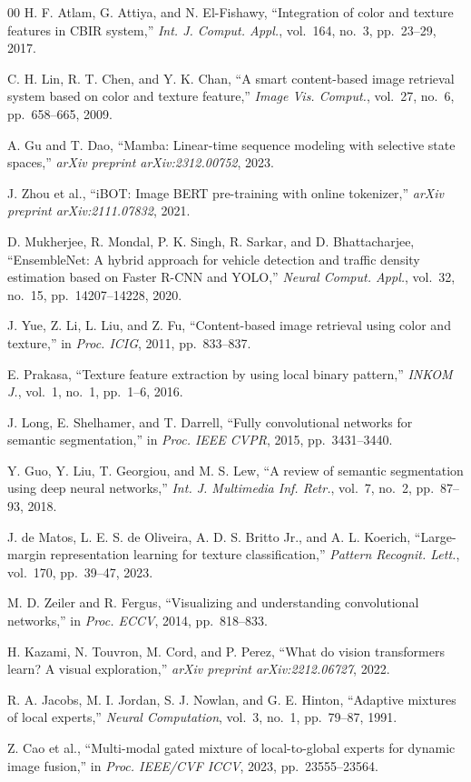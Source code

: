 \documentclass[letterpaper, 10 pt, conference]{ieeeconf}
\begin{document}
\begin{thebibliography}{00}
H. F. Atlam, G. Attiya, and N. El-Fishawy, ``Integration of color and
texture features in CBIR system,'' \emph{Int. J. Comput. Appl.},
vol.~164, no.~3, pp.~23--29, 2017.

C. H. Lin, R. T. Chen, and Y. K. Chan, ``A smart content-based image
retrieval system based on color and texture feature,'' \emph{Image Vis.
Comput.}, vol.~27, no.~6, pp.~658--665, 2009.

A. Gu and T. Dao, ``Mamba: Linear-time sequence modeling with selective
state spaces,'' \emph{arXiv preprint arXiv:2312.00752}, 2023.

J. Zhou et al., ``iBOT: Image BERT pre-training with online tokenizer,''
\emph{arXiv preprint arXiv:2111.07832}, 2021.

D. Mukherjee, R. Mondal, P. K. Singh, R. Sarkar, and D. Bhattacharjee,
``EnsembleNet: A hybrid approach for vehicle detection and traffic density
estimation based on Faster R-CNN and YOLO,'' \emph{Neural Comput. Appl.},
vol.~32, no.~15, pp.~14207--14228, 2020.

J. Yue, Z. Li, L. Liu, and Z. Fu, ``Content-based image retrieval using
color and texture,'' in \emph{Proc. ICIG}, 2011, pp.~833--837.

E. Prakasa, ``Texture feature extraction by using local binary pattern,''
\emph{INKOM J.}, vol.~1, no.~1, pp.~1--6, 2016.

J. Long, E. Shelhamer, and T. Darrell, ``Fully convolutional networks for
semantic segmentation,'' in \emph{Proc. IEEE CVPR}, 2015, pp.~3431--3440.

Y. Guo, Y. Liu, T. Georgiou, and M. S. Lew, ``A review of semantic
segmentation using deep neural networks,'' \emph{Int. J. Multimedia Inf.
Retr.}, vol.~7, no.~2, pp.~87--93, 2018.

J. de Matos, L. E. S. de Oliveira, A. D. S. Britto Jr., and
A. L. Koerich, ``Large-margin representation learning for texture
classification,'' \emph{Pattern Recognit. Lett.}, vol.~170, pp.~39--47,
2023.

M. D. Zeiler and R. Fergus, ``Visualizing and understanding convolutional
networks,'' in \emph{Proc. ECCV}, 2014, pp.~818--833.

H. Kazami, N. Touvron, M. Cord, and P. Perez, ``What do vision
transformers learn? A visual exploration,''
\emph{arXiv preprint arXiv:2212.06727}, 2022.

R. A. Jacobs, M. I. Jordan, S. J. Nowlan, and G. E. Hinton,
``Adaptive mixtures of local experts,''
\emph{Neural Computation}, vol.~3, no.~1, pp.~79--87, 1991.

Z. Cao et al., ``Multi-modal gated mixture of local-to-global experts for
dynamic image fusion,'' in \emph{Proc. IEEE/CVF ICCV}, 2023,
pp.~23555--23564.

\end{thebibliography}
\end{document}
